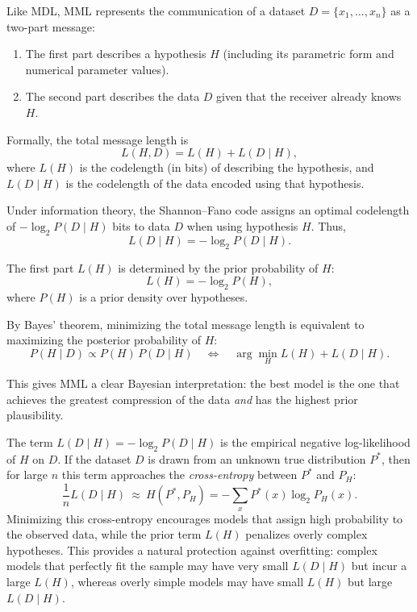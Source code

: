 Like MDL, MML represents the communication of a dataset $D=\{x_1,\ldots,x_n\}$ as a two-part message:
\begin{enumerate}
    \item The first part describes a hypothesis $H$ (including its parametric form and numerical parameter values).
    \item The second part describes the data $D$ given that the receiver already knows $H$.
\end{enumerate}

Formally, the total message length is
\[
L(H,D) = L(H) + L(D \mid H),
\]
where $L(H)$ is the codelength (in bits) of describing the hypothesis, and $L(D \mid H)$ is the codelength of the data encoded using that hypothesis.

Under information theory, the Shannon–Fano code assigns an optimal codelength of $-\log_2 P(D\mid H)$ bits to data $D$ when using hypothesis $H$. Thus,
\[
L(D\mid H) = -\log_2 P(D\mid H).
\]

The first part $L(H)$ is determined by the prior probability of $H$:
\[
L(H) = -\log_2 P(H),
\]
where $P(H)$ is a prior density over hypotheses. 

By Bayes’ theorem, minimizing the total message length is equivalent to maximizing the posterior probability of $H$:
\[
P(H\mid D) \propto P(H)\,P(D\mid H) \quad\Longleftrightarrow\quad 
\arg\min_H L(H)+L(D\mid H).
\]

This gives MML a clear Bayesian interpretation: the best model is the one that achieves the greatest compression of the data \emph{and} has the highest prior plausibility.

The term $L(D\mid H)=-\log_2 P(D\mid H)$ is the empirical negative log-likelihood of $H$ on $D$. 
If the dataset $D$ is drawn from an unknown true distribution $P^\ast$, then for large $n$ this term approaches the \emph{cross-entropy} between $P^\ast$ and $P_H$:
\[
\frac{1}{n}L(D\mid H)\ \approx\ H(P^\ast,P_H) = -\sum_{x} P^\ast(x)\log_2 P_H(x).
\]
Minimizing this cross-entropy encourages models that assign high probability to the observed data, while the prior term $L(H)$ penalizes overly complex hypotheses. 
This provides a natural protection against overfitting: complex models that perfectly fit the sample may have very small $L(D\mid H)$ but incur a large $L(H)$, whereas overly simple models may have small $L(H)$ but large $L(D\mid H)$.

